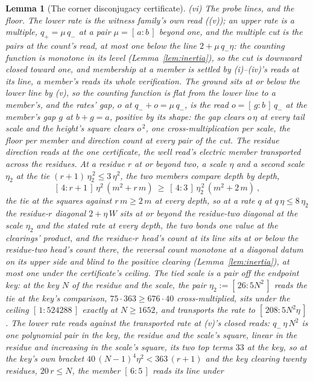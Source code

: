 \documentclass[11pt]{article}
\newtheorem{lemma}{Lemma}
\theoremstyle{definition}
\begin{document}
\begin{lemma}[The corner disconjugacy certificate]
\emph{(vi) The probe lines, and the floor.} The lower rate is the
witness family's own read ((v)); an upper rate is a multiple,
$q_{+}=\mu\,q_{-}$ at a pair $\mu=[\,a:b\,]$ beyond one, and the
\emph{multiple cut} is the pairs at the count's read, at most one
below the line $2+\mu\,q_{-}\eta$: the counting function is
monotone in its level (Lemma~\ref{lem:inertia}), so the cut is
downward closed toward one, and membership at a member is settled
by (i)--(iv)'s reads at its line, a member's reads its whole
verification. The ground sits at or below the lower line by (v),
so the counting function is flat from the lower line to a
member's, and the rates' gap, $o$ at $q_{-}+o=\mu\,q_{-}$, is the
read $o=[\,g:b\,]\,q_{-}$ at the member's gap $g$ at $b+g=a$,
positive by its shape: the gap clears $o\,\eta$ at every
tail scale and the height's square clears $o^{\,2}$, one
cross-multiplication per scale, the floor per member and
direction count at every pair of the cut. The residue direction
reads at the one certificate, the well read's electric member
transported across the residues. At a residue $r$ at or beyond
two, a scale $\eta$ and a second scale $\eta_2$ at the tie
$(r+1)\,\eta_2^{\,2}\le3\,\eta^{2}$, the two members compare depth
by depth,
\[
[\,4:r+1\,]\,\eta^{2}\,(m^{2}+r\,m)\ \ge\
[\,4:3\,]\,\eta_2^{\,2}\,(m^{2}+2\,m)\ ,
\]
the tie at the squares against $r\,m\ge2\,m$ at every depth, so at
a rate $q$ at $q\,\eta\le8\,\eta_2$ the residue-$r$ diagonal
$2+\eta\,W$ sits at or beyond the residue-two diagonal at the scale
$\eta_2$ and the stated rate at every depth, the two bonds one
value at the clearings' product, and the residue-$r$ head's count
at its line sits at or below the residue-two head's count there,
the reversal count monotone at a diagonal datum on its upper side
and blind to the positive clearing (Lemma~\ref{lem:inertia}), at
most one under the certificate's ceiling. The tied scale is a pair
off the endpoint key: at the key $N$ of the residue and the scale,
the pair $\eta_2:=[\,26:5N^{2}\,]$ reads the tie at the key's
comparison, $75\cdot363\ge676\cdot40$ cross-multiplied, sits under
the ceiling $[\,1:524288\,]$ exactly at $N\ge1652$, and transports
the rate to $[\,208:5N^{2}\eta\,]$. The lower rate reads against
the transported rate at (v)'s closed reads: $q_{-}\,\eta\,N^{2}$ is
one polynomial pair in the key, the residue and the scale's square,
linear in the residue and increasing in the scale's square, its two
top terms $33$ at the key, so at the key's own bracket
$40\,(N{-}1)^{4}\eta^{2}<363\,(r+1)$ and the key clearing twenty
residues, $20\,r\le N$, the member $[\,6:5\,]$ reads its line under

\end{lemma}
\end{document}
